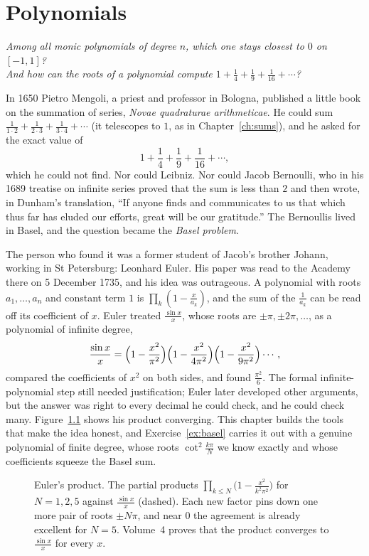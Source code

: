 \chapter{Polynomials}\label{ch:polynomials}

\begin{center}\itshape
Among all monic polynomials of degree $n$, which one stays closest to $0$ on $[-1,1]$?\\
And how can the roots of a polynomial compute $1+\frac14+\frac19+\frac1{16}+\cdots$?
\end{center}

In 1650 Pietro Mengoli, a priest and professor in Bologna, published a little book on the summation of series, \emph{Novae quadraturae
arithmeticae}. He could sum $\frac1{1\cdot2}+\frac1{2\cdot3}+\frac1{3\cdot4}+\cdots$ (it telescopes to $1$, as in Chapter~\ref{ch:sums}), and he asked for the
exact value of
\[
1+\frac14+\frac19+\frac1{16}+\cdots,
\]
which he could not find. Nor could Leibniz. Nor could Jacob Bernoulli, who in his 1689 treatise on infinite series proved that the sum is less than
$2$ and then wrote, in Dunham's translation, ``If anyone finds and communicates to us that which thus far has eluded our efforts, great will be our
gratitude.'' The Bernoullis lived in Basel, and the question became the \emph{Basel problem}.

The person who found it was a former student of Jacob's brother Johann, working in St Petersburg:
Leonhard Euler. His paper was read to the Academy there on 5 December 1735, and his idea was outrageous. A polynomial with roots $a_1,\dots,a_n$
and constant term $1$ is $\prod_k(1-\frac x{a_k})$, and the sum of the $\frac1{a_k}$ can be read off its coefficient of $x$. Euler treated
$\frac{\sin x}x$, whose roots are $\pm\pi,\pm2\pi,\dots$, as a polynomial of infinite degree,
\[
\frac{\sin x}x=\Bigl(1-\frac{x^2}{\pi^2}\Bigr)\Bigl(1-\frac{x^2}{4\pi^2}\Bigr)\Bigl(1-\frac{x^2}{9\pi^2}\Bigr)\cdots,
\]
compared the coefficients of $x^2$ on both sides, and found $\frac{\pi^2}6$. The formal infinite-polynomial step still needed justification; Euler later developed other arguments, but the answer was right to every decimal he could check, and he could check many. Figure~\ref{fig:sineprod} shows
his product converging. This chapter builds the tools that make the idea honest, and Exercise~\ref{ex:basel} carries it out with a genuine
polynomial of finite degree, whose roots $\cot^2\frac{k\pi}N$ we know exactly and whose coefficients squeeze the Basel sum.

\begin{figure}[ht]
\centering
{}
\caption{Euler's product. The partial products $\prod_{k\le N}\bigl(1-\frac{x^2}{k^2\pi^2}\bigr)$ for $N=1,2,5$ against $\frac{\sin x}x$ (dashed).
Each new factor pins down one more pair of roots $\pm N\pi$, and near $0$ the agreement is already excellent for $N=5$. Volume~4 proves that the product converges to $\frac{\sin x}x$ for every $x$.}
\label{fig:sineprod}
\end{figure}

